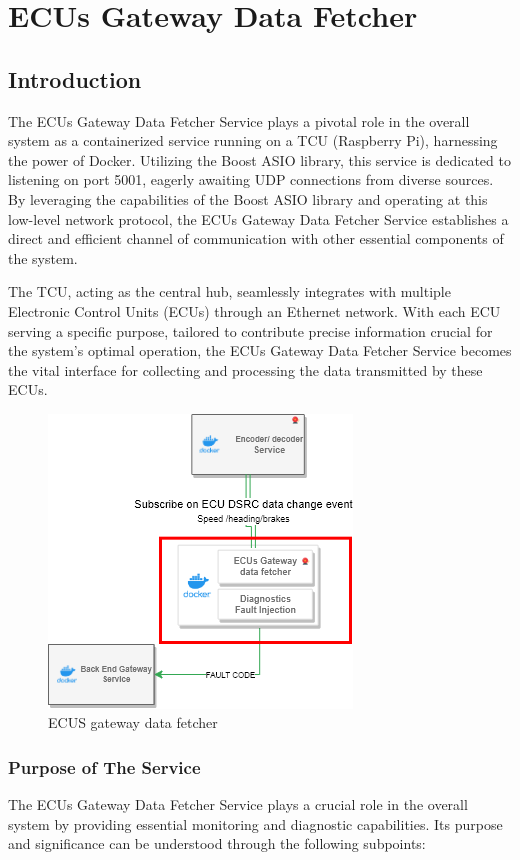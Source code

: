 \documentclass[
12pt,
oneside, 
onehalfspacing, 
nolistspacing, 
parskip, 
chapterinoneline, 
]{AASTCOMPUTER}
\begin{document}
\section{ECUs Gateway Data Fetcher}
\subsection{Introduction}
The ECUs Gateway Data Fetcher Service plays a pivotal role in the overall system as a containerized service running on a TCU (Raspberry Pi), harnessing the power of Docker. Utilizing the Boost ASIO library, this service is dedicated to listening on port 5001, eagerly awaiting UDP connections from diverse sources. By leveraging the capabilities of the Boost ASIO library and operating at this low-level network protocol, the ECUs Gateway Data Fetcher Service establishes a direct and efficient channel of communication with other essential components of the system.

The TCU, acting as the central hub, seamlessly integrates with multiple Electronic Control Units (ECUs) through an Ethernet network. With each ECU serving a specific purpose, tailored to contribute precise information crucial for the system's optimal operation, the ECUs Gateway Data Fetcher Service becomes the vital interface for collecting and processing the data transmitted by these ECUs.

\begin{figure}[!ht]
\centering
\includegraphics[scale=0.5]{Figures/27.png}
\caption[ECUS gateway data fetcher]{ECUS gateway data fetcher}
\label{fig:ECUS gateway data fetcher}
\end{figure}
\subsubsection{Purpose of The Service}
The ECUs Gateway Data Fetcher Service plays a crucial role in the overall system by providing essential monitoring and diagnostic capabilities. Its purpose and significance can be understood through the following subpoints:
\end{document}
